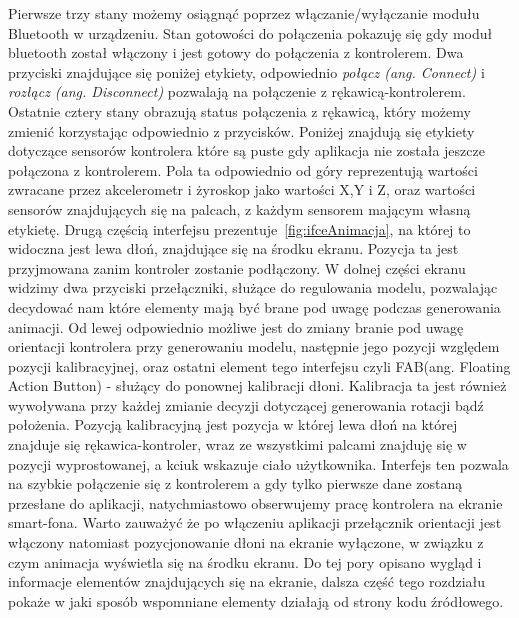Pierwsze trzy stany możemy osiągnąć poprzez włączanie/wyłączanie modułu Bluetooth w urządzeniu. Stan gotowości do połączenia pokazuję się gdy moduł bluetooth został włączony i jest gotowy do połączenia z kontrolerem. Dwa przyciski znajdujące się poniżej etykiety, odpowiednio \textit{połącz (ang. Connect)} i \textit{rozłącz (ang. Disconnect)} pozwalają na połączenie z rękawicą-kontrolerem. Ostatnie cztery stany obrazują status połączenia z rękawicą, który możemy zmienić korzystając odpowiednio z przycisków. Poniżej znajdują się etykiety dotyczące sensorów kontrolera które są puste gdy aplikacja nie została jeszcze połączona z kontrolerem. Pola ta odpowiednio od góry reprezentują wartości zwracane przez akcelerometr i żyroskop jako wartości X,Y i Z, oraz wartości sensorów znajdujących się na palcach, z każdym sensorem mającym własną etykietę. Drugą częścią interfejsu prezentuje~\ref{fig:ifceAnimacja}, na której to widoczna jest lewa dłoń, znajdujące się na środku ekranu. Pozycja ta jest przyjmowana zanim kontroler zostanie podłączony. W dolnej części ekranu widzimy dwa przyciski przełączniki, służące do regulowania modelu, pozwalając decydować nam które elementy mają być brane pod uwagę podczas generowania animacji. Od lewej odpowiednio możliwe jest do zmiany branie pod uwagę orientacji kontrolera przy generowaniu modelu, następnie jego pozycji względem pozycji kalibracyjnej, oraz ostatni element tego interfejsu czyli FAB(ang. Floating Action Button) - służący do ponownej kalibracji dłoni. Kalibracja ta jest również wywoływana przy każdej zmianie decyzji dotyczącej generowania rotacji bądź położenia. Pozycją kalibracyjną jest pozycja w której lewa dłoń na której znajduje się rękawica-kontroler, wraz ze wszystkimi palcami znajduję się w pozycji wyprostowanej, a kciuk wskazuje ciało użytkownika. Interfejs ten pozwala na szybkie połączenie się z kontrolerem a gdy tylko pierwsze dane zostaną przesłane do aplikacji, natychmiastowo obserwujemy pracę kontrolera na ekranie smart-fona. Warto zauważyć że po włączeniu aplikacji przełącznik orientacji jest włączony natomiast pozycjonowanie dłoni na ekranie wyłączone, w związku z czym animacja wyświetla się na środku ekranu. Do tej pory opisano wygląd i informacje elementów znajdujących się na ekranie, dalsza część tego rozdziału pokaże w jaki sposób wspomniane elementy działają od strony kodu źródłowego.

